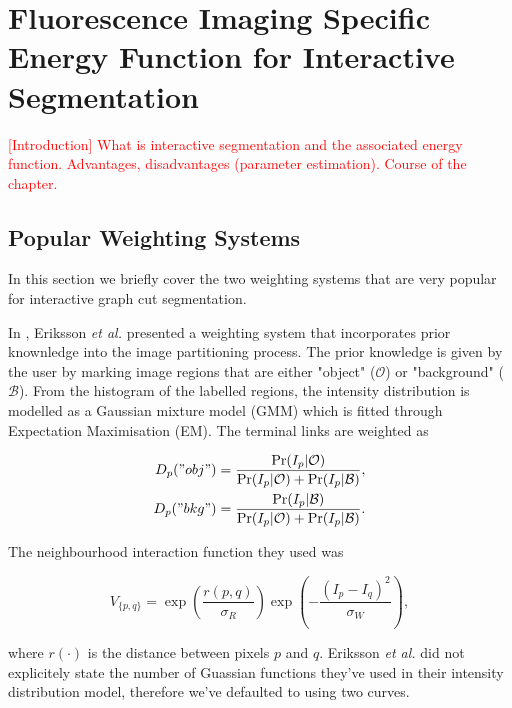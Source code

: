 
\chapter{Fluorescence Imaging Specific Energy Function for Interactive Segmentation} %

\label{chap:Chapter3} %

\textcolor{red}{[Introduction] What is interactive segmentation and the associated energy function. Advantages, disadvantages (parameter estimation). Course of the chapter.}


\section{Popular Weighting Systems}
\label{sec:interactivepopularweighting}

In this section we briefly cover the two weighting systems that are very popular for interactive graph cut segmentation.

\begin{definition} In \citep{Eriksson2006}, Eriksson \textit{et al.} presented a weighting system that incorporates prior knownledge into the image partitioning process. The prior knowledge is given by the user by marking image regions that are either "object" ($\mathcal{O}$) or "background" ($\mathcal{B}$). From the histogram of the labelled regions, the intensity distribution is modelled as a Gaussian mixture model (GMM) which is fitted through Expectation Maximisation (EM). The terminal links are weighted as
	
\begin{align}
	D_p("obj") &= \frac{\Pr(I_p|\mathcal{O})}{\Pr(I_p|\mathcal{O})+\Pr(I_p|\mathcal{B})}, \\
	D_p("bkg") &= \frac{\Pr(I_p|\mathcal{B})}{\Pr(I_p|\mathcal{O})+\Pr(I_p|\mathcal{B})}.
\end{align}

The neighbourhood interaction function they used was
	
\begin{equation}
	V_{\{p,q\}} = \exp\left( \frac{r(p,q)}{\sigma_R} \right)\exp\left( -\frac{(I_p-I_q)^2}{\sigma_W} \right),
\end{equation}
	
where $r(\cdot)$ is the distance between pixels $p$ and $q$. Eriksson \textit{et al.} did not explicitely state the number of Guassian functions they've used in their intensity distribution model, therefore we've defaulted to using two curves.
	
\end{definition}

